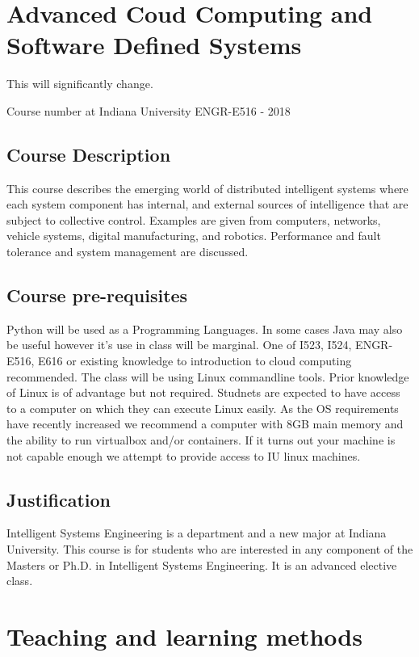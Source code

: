 \CHANGE
\FILENAME

\section{Advanced Coud Computing and Software Defined Systems}

This will significantly change.

Course number at Indiana University ENGR-E516 - 2018

\subsection{Course Description}

This course describes the emerging world of distributed intelligent
systems where each system component has internal, and external sources
of intelligence that are subject to collective control. Examples are
given from computers, networks, vehicle systems, digital
manufacturing, and robotics. Performance and fault tolerance and
system management are discussed.

\subsection{Course pre-requisites}

Python will be used as a Programming Languages. In some cases Java may
also be useful however it's use in class will be marginal. One of
I523, I524, ENGR-E516, E616 or existing knowledge to introduction to
cloud computing recommended. The class will be using Linux commandline
tools. Prior knowledge of Linux is of advantage but not required.
Studnets are expected to have access to a computer on which they can
execute Linux easily. As the OS requirements have recently increased
we recommend a computer with 8GB main memory and the ability to run
virtualbox and/or containers. If it turns out your machine is not
capable enough we attempt to provide access to IU linux machines.

\subsection{Justification}

Intelligent Systems Engineering is a department and a new major at
Indiana University. This course is for students who are interested in
any component of the Masters or Ph.D. in Intelligent Systems
Engineering. It is an advanced elective class.

\section{Teaching and learning methods}

